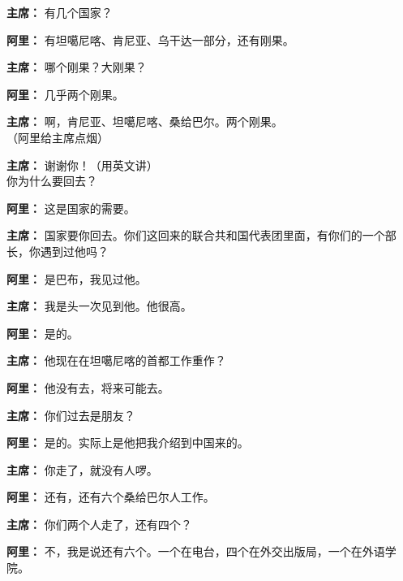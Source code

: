 \begin{list}{}
\item[\textbf{主席：}] 有几个国家？

\item[\textbf{阿里：}] 有坦噶尼喀、肯尼亚、乌干达一部分，还有刚果。

\item[\textbf{主席：}] 哪个刚果？大刚果？

\item[\textbf{阿里：}] 几乎两个刚果。

\item[\textbf{主席：}] 啊，肯尼亚、坦噶尼喀、桑给巴尔。两个刚果。\\（阿里给主席点烟）

\item[\textbf{主席：}] 谢谢你！（用英文讲）\\你为什么要回去？

\item[\textbf{阿里：}] 这是国家的需要。

\item[\textbf{主席：}] 国家要你回去。你们这回来的联合共和国代表团里面，有你们的一个部长，你遇到过他吗？

\item[\textbf{阿里：}] 是巴布，我见过他。

\item[\textbf{主席：}] 我是头一次见到他。他很高。

\item[\textbf{阿里：}] 是的。

\item[\textbf{主席：}] 他现在在坦噶尼喀的首都工作重作？

\item[\textbf{阿里：}] 他没有去，将来可能去。

\item[\textbf{主席：}] 你们过去是朋友？

\item[\textbf{阿里：}] 是的。实际上是他把我介绍到中国来的。

\item[\textbf{主席：}] 你走了，就没有人啰。

\item[\textbf{阿里：}] 还有，还有六个桑给巴尔人工作。

\item[\textbf{主席：}] 你们两个人走了，还有四个？

\item[\textbf{阿里：}] 不，我是说还有六个。一个在电台，四个在外交出版局，一个在外语学院。


\end{list}
